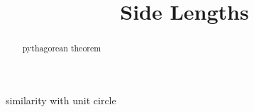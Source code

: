 \documentclass{ximera}
\title{Side Lengths}
\begin{document}
\begin{abstract}
pythagorean theorem
\end{abstract}
\maketitle





similarity with unit circle
\end{document}
